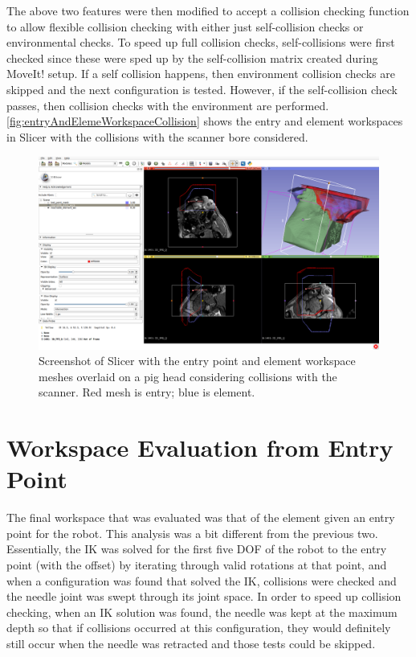 \documentclass[12pt]{report}
\makeatletter
\renewcommand{\todo}[2][]{%
    \@todo[caption={#2}, #1]{\begin{spacing}{0.5}#2\end{spacing}}%
}
\makeatother
\begin{document}
The above two features were then modified to accept a collision checking function to allow flexible collision checking with either just self-collision checks or environmental checks. To speed up full collision checks, self-collisions were first checked since these were sped up by the self-collision matrix created during MoveIt! setup. If a self collision happens, then environment collision checks are skipped and the next configuration is tested. However, if the self-collision check passes, then collision checks with the environment are performed. \autoref{fig:entryAndElemeWorkspaceCollision} shows the entry and element workspaces in Slicer with the collisions with the scanner bore considered.

\begin{figure}[thpb]
	\centering
	\includegraphics[width=\textwidth]{images/slicer_entry_and_elem_with_bore.png}
    \caption{Screenshot of Slicer with the entry point and element workspace meshes overlaid on a pig head considering collisions with the scanner. Red mesh is entry; blue is element.}
    \label{fig:entryAndElemeWorkspaceCollision}
\end{figure}


\section{Workspace Evaluation from Entry Point}
The final workspace that was evaluated was that of the element given an entry point for the robot. This analysis was a bit different from the previous two. Essentially, the IK was solved for the first five DOF of the robot to the entry point (with the offset) \todo{GF: registration?} by iterating through valid rotations at that point, and when a configuration was found that solved the IK, collisions were checked and the needle joint was swept through its joint space. In order to speed up collision checking, when an IK solution was found, the needle was kept at the maximum depth so that if collisions occurred at this configuration, they would definitely still occur when the needle was retracted and those tests could be skipped.
\end{document}
